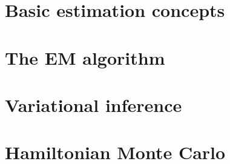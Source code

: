 \documentclass[a4paper,showframe,11pt]{report}
\begin{document}

\renewcommand{\chaptername}{Supplementary}
\setcounter{table}{0}
\renewcommand{\thetable}{S\arabic{table}}%
\setcounter{figure}{0}
\renewcommand{\thefigure}{S\arabic{figure}}%
\setcounter{chapter}{0}
\renewcommand{\thechapter}{S\arabic{chapter}}%
\setcounter{section}{0}

\chapter{Basic estimation concepts}


\chapter{The EM algorithm}


\chapter{Variational inference}


\chapter{Hamiltonian Monte Carlo}



\hClosingStuffStandalone
\end{document}
